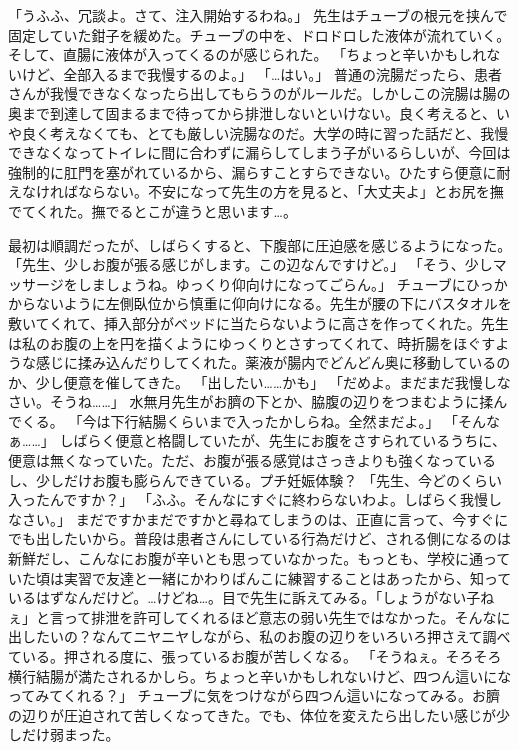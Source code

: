 「うふふ、冗談よ。さて、注入開始するわね。」
先生はチューブの根元を挟んで固定していた鉗子を緩めた。チューブの中を、ドロドロした液体が流れていく。
そして、直腸に液体が入ってくるのが感じられた。
「ちょっと辛いかもしれないけど、全部入るまで我慢するのよ。」
「…はい。」
普通の浣腸だったら、患者さんが我慢できなくなったら出してもらうのがルールだ。しかしこの浣腸は腸の奥まで到達して固まるまで待ってから排泄しないといけない。良く考えると、いや良く考えなくても、とても厳しい浣腸なのだ。大学の時に習った話だと、我慢できなくなってトイレに間に合わずに漏らしてしまう子がいるらしいが、今回は強制的に肛門を塞がれているから、漏らすことすらできない。ひたすら便意に耐えなければならない。不安になって先生の方を見ると、「大丈夫よ」とお尻を撫でてくれた。撫でるとこが違うと思います…。

最初は順調だったが、しばらくすると、下腹部に圧迫感を感じるようになった。
「先生、少しお腹が張る感じがします。この辺なんですけど。」
「そう、少しマッサージをしましょうね。ゆっくり仰向けになってごらん。」
チューブにひっかからないように左側臥位から慎重に仰向けになる。先生が腰の下にバスタオルを敷いてくれて、挿入部分がベッドに当たらないように高さを作ってくれた。先生は私のお腹の上を円を描くようにゆっくりとさすってくれて、時折腸をほぐすような感じに揉み込んだりしてくれた。薬液が腸内でどんどん奥に移動しているのか、少し便意を催してきた。
「出したい……かも」
「だめよ。まだまだ我慢しなさい。そうね……」
水無月先生がお臍の下とか、脇腹の辺りをつまむように揉んでくる。
「今は下行結腸くらいまで入ったかしらね。全然まだよ。」
「そんなぁ……」
しばらく便意と格闘していたが、先生にお腹をさすられているうちに、便意は無くなっていた。ただ、お腹が張る感覚はさっきよりも強くなっているし、少しだけお腹も膨らんできている。プチ妊娠体験？
「先生、今どのくらい入ったんですか？」
「ふふ。そんなにすぐに終わらないわよ。しばらく我慢しなさい。」
まだですかまだですかと尋ねてしまうのは、正直に言って、今すぐにでも出したいから。普段は患者さんにしている行為だけど、される側になるのは新鮮だし、こんなにお腹が辛いとも思っていなかった。もっとも、学校に通っていた頃は実習で友達と一緒にかわりばんこに練習することはあったから、知っているはずなんだけど。…けどね…。目で先生に訴えてみる。「しょうがない子ねぇ」と言って排泄を許可してくれるほど意志の弱い先生ではなかった。そんなに出したいの？なんてニヤニヤしながら、私のお腹の辺りをいろいろ押さえて調べている。押される度に、張っているお腹が苦しくなる。
「そうねぇ。そろそろ横行結腸が満たされるかしら。ちょっと辛いかもしれないけど、四つん這いになってみてくれる？」
チューブに気をつけながら四つん這いになってみる。お臍の辺りが圧迫されて苦しくなってきた。でも、体位を変えたら出したい感じが少しだけ弱まった。
